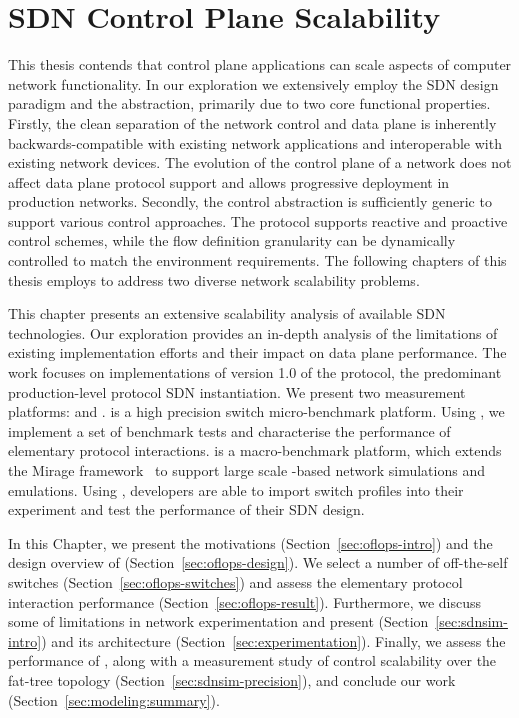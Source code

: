 \chapter{SDN Control Plane Scalability} \label{sec:sdn_scalability} 

This thesis contends that control plane applications can scale aspects of
computer network functionality. In our exploration we extensively employ the SDN
design paradigm and the \of abstraction, primarily due to two core
functional properties.  Firstly, the clean separation of the network control
and data plane is inherently backwards-compatible with existing network
applications and interoperable with existing network devices.  The evolution of
the control plane of a network does not affect data plane protocol support and
allows progressive deployment in production networks.  Secondly, the \of control
abstraction is sufficiently generic to support various control approaches. The
protocol supports reactive and proactive control schemes, while the flow
definition granularity can be dynamically controlled to match the environment
requirements. The following chapters of this thesis employs \of to
address two diverse network scalability problems. 

This chapter presents an extensive scalability analysis of available SDN
technologies. Our exploration provides an in-depth analysis of the limitations
of existing implementation efforts and their impact on data plane performance.
The work focuses on implementations of version 1.0 of the \of protocol, the
predominant production-level protocol SDN instantiation.  We present two
measurement platforms: \oflops and \sdnsim.  \oflops is a high precision \of
switch micro-benchmark platform. Using \oflops, we implement a set of benchmark
tests and characterise the performance of elementary protocol interactions.
\sdnsim is a macro-benchmark \of platform, which extends the Mirage
framework~ to support large scale \of-based network
simulations and emulations.  Using \sdnsim, developers are able to import
\oflops switch profiles into their experiment and test the performance of their
SDN design.

In this Chapter, we present the motivations (Section~\ref{sec:oflops-intro})
and the design overview of \oflops (Section~\ref{sec:oflops-design}). We select
a number of off-the-self \of switches (Section~\ref{sec:oflops-switches}) and
assess the elementary protocol interaction performance
(Section~\ref{sec:oflops-result}). Furthermore, we discuss some of limitations
in network experimentation and present \sdnsim (Section~\ref{sec:sdnsim-intro})
and its architecture (Section~\ref{sec:experimentation}). Finally, we assess
the performance of \sdnsim, along with a measurement study of control
scalability over the fat-tree topology (Section~\ref{sec:sdnsim-precision}),
and conclude our work (Section~\ref{sec:modeling:summary}). 


